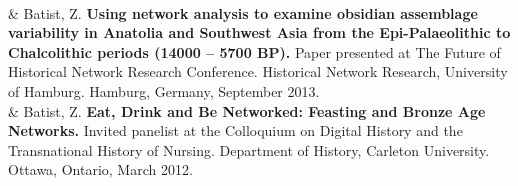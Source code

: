 \documentclass[11pt, a4paper]{article}
\newcommand{\LastName}{Batist}
\newcommand{\Initials}{Z}
\newcommand{\Me}{\LastName, \Initials}
\newcommand{\Year}[1]{\fontsize{10pt}{0}\selectfont #1}
\begin{document}
\begin{EntriesTable}
  \\
\Year{2013}  &
  \Me.
  \textbf{Using network analysis to examine obsidian assemblage variability in Anatolia and Southwest Asia from the Epi-Palaeolithic to Chalcolithic periods (14000 – 5700 BP).}
  Paper presented at The Future of Historical Network Research Conference. Historical Network Research, University of Hamburg. Hamburg, Germany, September 2013.
  \\
\Year{2012}  &
  \Me.
  \textbf{Eat, Drink and Be Networked: Feasting and Bronze Age Networks.}
  Invited panelist at the Colloquium on Digital History and the Transnational History of Nursing. Department of History, Carleton University. Ottawa, Ontario, March 2012.
\end{EntriesTable}


\end{document}
